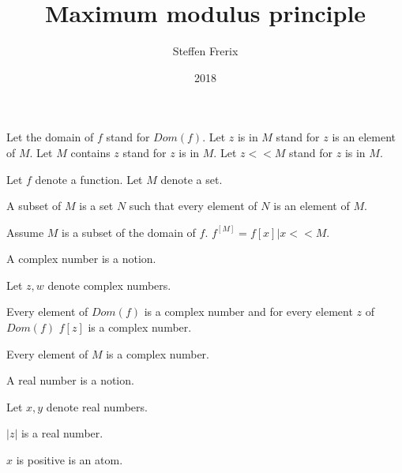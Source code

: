 \documentclass{document}
\title{Maximum modulus principle}
\author{Steffen Frerix}
\date{2018}
\begin{document}

  \maketitle

  \begin{forthel}

    Let the domain of $f$ stand for $Dom(f)$.
    Let $z$ is in $M$ stand for $z$ is an element of $M$.
    Let $M$ contains $z$ stand for $z$ is in $M$.
    Let $z << M$ stand for $z$ is in $M$.

    Let $f$ denote a function.
    Let $M$ denote a set.

    \begin{definition}
      A subset of $M$ is a set $N$ such that every element of $N$ is an element of $M$.
    \end{definition}

    \begin{definition}
      Assume $M$ is a subset of the domain of $f$. $f^[M] = { f[x] | x << M }$.
    \end{definition}

    \begin{signature}
      A complex number is a notion.
    \end{signature}

    Let $z,w$ denote complex numbers.

    \begin{axiom}
      Every element of $Dom(f)$ is a complex number and for every element $z$ of $Dom(f)$ $f[z]$ is a complex number.
    \end{axiom}

    \begin{axiom}
      Every element of $M$ is a complex number.
    \end{axiom}

    \begin{signature}
      A real number is a notion.
    \end{signature}

    Let $x,y$ denote real numbers.

    \begin{signature}
      $|z|$ is a real number.
    \end{signature}

    \begin{signature}
      $x$ is positive is an atom.
    \end{signature}


\end{forthel}
\end{document}
